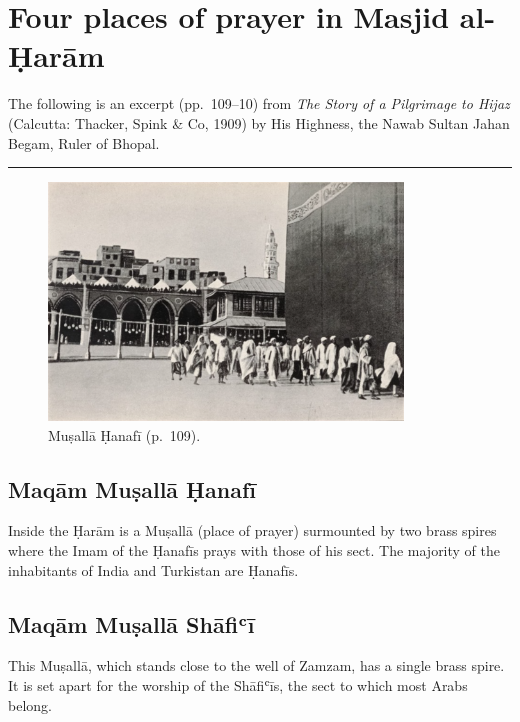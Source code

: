 \hypertarget{four-places-of-prayer-haram}{%
  \chapter{Four places of prayer in Masjid al-Ḥarām}\label{four-places-of-prayer-haram}}


The following is an excerpt (pp.\ 109–10) from \textit{The Story of a Pilgrimage to Hijaz} (Calcutta: Thacker, Spink \& Co, 1909) by His Highness, the Nawab Sultan Jahan Begam, Ruler of Bhopal.\\
\hrule

\begin{figure}
  \begin{center}
    \includegraphics[width=0.84\textwidth]{images/haram2}
  \end{center}
  \caption*{Muṣallā Ḥanafī (p.\ 109).}
\end{figure}

\section*{Maqām Muṣallā Ḥanafī}

Inside the Ḥarām is a Muṣallā (place of prayer) surmounted by two brass spires where the Imam of the Ḥanafīs prays with those of his sect. The majority of the inhabitants of India and Turkistan are Ḥanafīs.

\section*{Maqām Muṣallā Shāfiʿī}

This Muṣallā, which stands close to the well of Zamzam, has a single brass spire. It is set apart for the worship of the Shāfiʿīs, the sect to which most Arabs belong.

